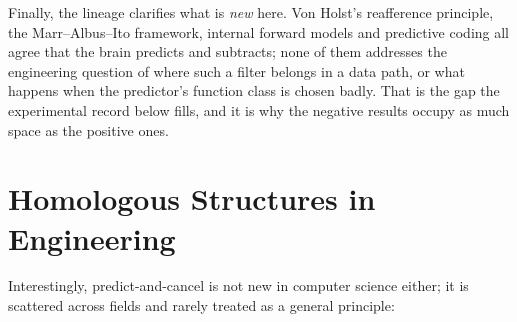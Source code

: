 \documentclass[12pt,a4paper]{article}
\begin{document}
Finally, the lineage clarifies what is \emph{new} here. Von Holst's reafference principle, the Marr--Albus--Ito framework, internal forward models and predictive coding all agree that the brain predicts and subtracts; none of them addresses the engineering question of where such a filter belongs in a data path, or what happens when the predictor's function class is chosen badly. That is the gap the experimental record below fills, and it is why the negative results occupy as much space as the positive ones.

\section{Homologous Structures in Engineering}
\label{sec:eng}

Interestingly, predict-and-cancel is not new in computer science either; it is scattered across fields and rarely treated as a general principle:
\end{document}
